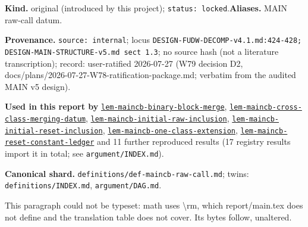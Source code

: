 \begin{defnote}
\textbf{Kind.} original (introduced by this project); \texttt{status: locked}.\quad\textbf{Aliases.} MAIN raw-call datum.
\par
\textbf{Provenance.} \texttt{source: internal}; locus \texttt{DESIGN-\allowbreak{}FUDW-\allowbreak{}DECOMP-\allowbreak{}v4.\allowbreak{}1.\allowbreak{}md:\allowbreak{}424-\allowbreak{}428;\allowbreak{} DESIGN-\allowbreak{}MAIN-\allowbreak{}STRUCTURE-\allowbreak{}v5.\allowbreak{}md sect 1.\allowbreak{}3}; no source hash (not a literature transcription); record: user-\allowbreak{}ratified 2026-\allowbreak{}07-\allowbreak{}27 (W79 decision D2,\allowbreak{} docs/\allowbreak{}plans/\allowbreak{}2026-\allowbreak{}07-\allowbreak{}27-\allowbreak{}W78-\allowbreak{}ratification-\allowbreak{}package.\allowbreak{}md;\allowbreak{} verbatim from the audited MAIN v5 design).
\par
\textbf{Used in this report by} \hyperref[lem:maincb-binary-block-merge]{\texttt{lem-\allowbreak{}maincb-\allowbreak{}binary-\allowbreak{}block-\allowbreak{}merge}}, \hyperref[lem:maincb-cross-class-merging-datum]{\texttt{lem-\allowbreak{}maincb-\allowbreak{}cross-\allowbreak{}class-\allowbreak{}merging-\allowbreak{}datum}}, \hyperref[lem:maincb-initial-raw-inclusion]{\texttt{lem-\allowbreak{}maincb-\allowbreak{}initial-\allowbreak{}raw-\allowbreak{}inclusion}}, \hyperref[lem:maincb-initial-reset-inclusion]{\texttt{lem-\allowbreak{}maincb-\allowbreak{}initial-\allowbreak{}reset-\allowbreak{}inclusion}}, \hyperref[lem:maincb-one-class-extension]{\texttt{lem-\allowbreak{}maincb-\allowbreak{}one-\allowbreak{}class-\allowbreak{}extension}}, \hyperref[lem:maincb-reset-constant-ledger]{\texttt{lem-\allowbreak{}maincb-\allowbreak{}reset-\allowbreak{}constant-\allowbreak{}ledger}} and 11 further reproduced results (17 registry results import it in total; see \texttt{argument/INDEX.md}).
\par
\textbf{Canonical shard.} \texttt{definitions/\allowbreak{}def-\allowbreak{}maincb-\allowbreak{}raw-\allowbreak{}call.\allowbreak{}md}; twins: \texttt{definitions/INDEX.md}, \texttt{argument/DAG.md}.
\par
\begin{defflag}
This paragraph could not be typeset: math uses \textbackslash{}rm, which report/main.tex does not define and the translation table does not cover. Its bytes follow, unaltered.
\end{defflag}


\end{defnote}

